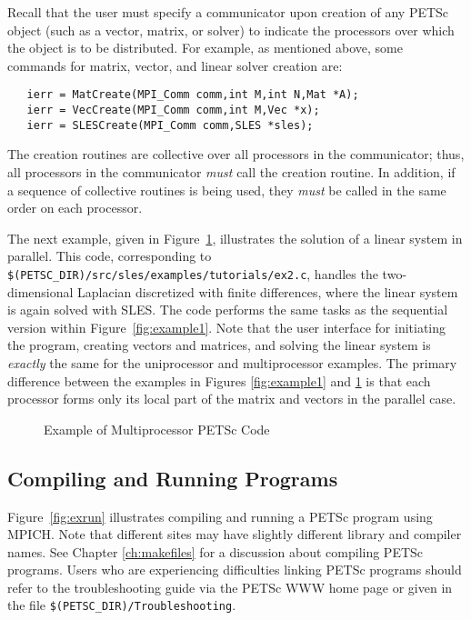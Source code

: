 {
Recall that the user must specify a communicator upon creation of any
PETSc object (such as a vector, matrix, or solver) to indicate the
processors over which the object is to be distributed.  For example,
as mentioned above, some commands for matrix, vector, and linear solver
creation are:
\begin{verbatim}
   ierr = MatCreate(MPI_Comm comm,int M,int N,Mat *A);
   ierr = VecCreate(MPI_Comm comm,int M,Vec *x);
   ierr = SLESCreate(MPI_Comm comm,SLES *sles); 
\end{verbatim}
The creation routines are collective over all processors in the
communicator; thus, all processors in the communicator {\em must}
call the creation routine.  In addition, if a sequence of
collective routines is being used, they {\em must} be called
in the same order on each processor.

The next example, given in Figure~\ref{fig:example2}, illustrates the
solution of a linear system in parallel.  This code, corresponding to
{\tt \$(PETSC\_DIR)/src/sles/examples/tutorials/ex2.c}, handles the
two-dimensional Laplacian discretized with finite differences, where
the linear system is again solved with SLES.  The code performs the
same tasks as the sequential version within Figure~\ref{fig:example1}.
Note that the user interface for initiating the program, creating
vectors and matrices, and solving the linear system is {\em exactly}
the same for the uniprocessor and multiprocessor examples.  The
primary difference between the examples in Figures \ref{fig:example1}
and \ref{fig:example2} is that each processor forms only its local
part of the matrix and vectors in the parallel case.

\begin{figure}[H]
{\footnotesize
{}
}
\nobreak
\caption{Example of Multiprocessor PETSc Code}
\label{fig:example2}
\end{figure}

\subsection*{Compiling and Running Programs}

Figure~\ref{fig:exrun} illustrates compiling and running a PETSc program
using MPICH.  Note that different sites may have slightly different
library and compiler names.  See Chapter \ref{ch:makefiles}
for a discussion about compiling PETSc programs.
Users who are experiencing difficulties linking PETSc programs should 
refer to the troubleshooting guide via the PETSc WWW home page or
given in the file {\tt \$(PETSC\_DIR)/Troubleshooting}.

}
